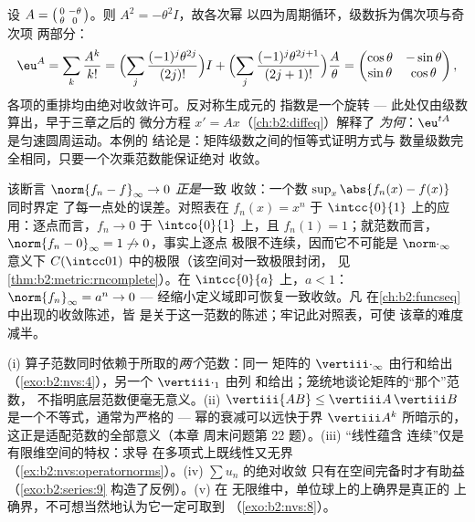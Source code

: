 \begin{example}[旋转生成元的指数]\label{ex:b2:nvs:rotationexp}
设 $A = \begin{psmallmatrix}0 & -\theta\\ \theta &
0\end{psmallmatrix}$。则 $A^2 = -\theta^2 I$，故各次幂
以四为周期循环，级数拆为偶次项与奇次项
两部分：
\[
\eu^{A} = \sum_{k}\frac{A^k}{k!}
= \Bigl(\sum_{j}\frac{(-1)^j\theta^{2j}}{(2j)!}\Bigr) I
+ \Bigl(\sum_{j}\frac{(-1)^j\theta^{2j+1}}{(2j+1)!}\Bigr)
\frac{A}{\theta}
= \begin{pmatrix}
\cos\theta & -\sin\theta\\
\sin\theta & \cos\theta
\end{pmatrix},
\]
各项的重排均由绝对收敛许可。反对称生成元的
指数是一个旋转 ---
此处仅由级数算出，早于三章之后的
微分方程 $x' = Ax$（\cref{ch:b2:diffeq}）解释了
\emph{为何}：$\eu^{tA}$ 是匀速圆周运动。本例的
结论是：矩阵级数之间的恒等式证明方式与
数量级数完全相同，只要一个次乘范数能保证绝对
收敛。
\end{example}

\begin{example}\label{ex:b2:nvs:uniformdictionary}
该断言 $\norm{f_n - f}_\infty \to 0$ \emph{正是}一致
收敛：一个数 $\sup_x\abs{f_n(x) - f(x)}$ 同时界定
了每一点处的误差。对照表在
$f_n(x) = x^n$ 于 $\intcc{0}{1}$ 上的应用：逐点而言，$f_n
\to 0$ 于 $\intco{0}{1}$ 上，且 $f_n(1) = 1$；就范数而言，
$\norm{f_n - 0}_\infty = 1 \not\to 0$，事实上逐点
极限不连续，因而它不可能是
$\norm\cdot_\infty$ 意义下 $C(\intcc01)$ 中的极限（该空间对一致极限封闭，
见\cref{thm:b2:metric:rncomplete}）。在
$\intcc{0}{a}$ 上，$a < 1$：$\norm{f_n}_\infty = a^n \to 0$ ---
经缩小定义域即可恢复一致收敛。凡
在\cref{ch:b2:funcseq}中出现的收敛陈述，皆
是关于这一范数的陈述；牢记此对照表，可使
该章的难度减半。
\end{example}

\begin{remark}[常见误区]\label{rem:b2:nvs:pitfalls}
(i) 算子范数同时依赖于所取的\emph{两个}范数：同一
矩阵的 $\vertiii\cdot_\infty$ 由行和给出
（\cref{exo:b2:nvs:4}），另一个 $\vertiii\cdot_1$ 由列
和给出；笼统地谈论矩阵的“那个”范数，
不指明底层范数便毫无意义。(ii) $\vertiii{AB} \leq
\vertiii A\,\vertiii B$ 是一个不等式，通常为严格的 ---
幂的衰减可以远快于界 $\vertiii A^k$
所暗示的，这正是适配范数的全部意义（本章
周末问题第 22 题）。(iii) “线性蕴含
连续”仅是有限维空间的特权：求导
在多项式上既线性又无界
（\cref{ex:b2:nvs:operatornorms}）。(iv) $\sum u_n$ 的绝对收敛
只有在空间完备时才有助益
（\cref{exo:b2:series:9} 构造了反例）。(v) 在
无限维中，单位球上的上确界是真正的
上确界，不可想当然地认为它一定可取到
（\cref{exo:b2:nvs:8}）。
\end{remark}

